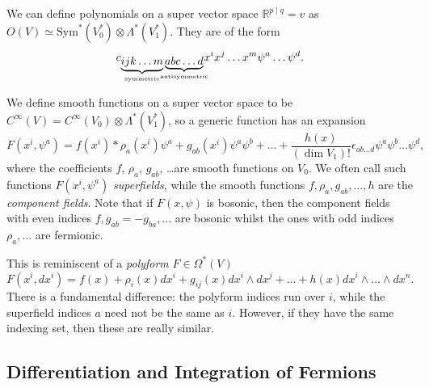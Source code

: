 
\begin{definition}[polynomials]
  We can define polynomials on a super vector space $\mathbb{R}^{p \mid q} = v$ as $O(V) \simeq \text{Sym}^*(V^*_0) \otimes \Lambda^* (V_1^*)$. They are of the form
  \begin{equation}
    c_{\underbrace{ijk \dots m}_{\mathclap{\text{symmetric}}} \underbrace{abc \dots d}_{\mathclap{\text{antisymmetric}}}} x^{i} x^{j} \dots x^{m} \psi^{a} \dots \psi^{d}.
  \end{equation}
\end{definition}
\begin{definition}
  We define smooth functions on a super vector space to be $C^\infty(V) = C^\infty(V_0) \otimes \Lambda^* (V_1^*)$, so a generic function has an expansion
  \begin{equation}
    F(x^{i}, \psi^{a}) = f(x^{i}) * \rho_a (x^{i}) \psi^{a} + g_{ab} (x^{i}) \psi^{a} \psi^{b} + \dots + \frac{h(x)}{(\dim V_1)!} \epsilon_{ab \dots d} \psi^{a} \psi^{b} \dots \psi^{d},
  \end{equation}
  where the coefficients $f$, $\rho_{a}$, $g_{ab}$, \dots are smooth functions on $V_0$. We often call such functions $F(x^{i}, \psi^{a})$ \emph{superfields}, while the smooth functions $f, \rho_a, g_{ab}, \dots, h$ are the \emph{component fields}.
  Note that if $F(x, \psi)$ is bosonic, then the component fields with even indices $f, g_{ab}=-g_{ba}, \dots$ are bosonic whilst the ones with odd indices $\rho_a, \dots$ are fermionic.
\end{definition}
\begin{remark}
  This is reminiscent of a \emph{polyform} $F\in \Omega^*(V)$
  \begin{equation}
    F(x^{i}, dx^{i}) = f(x) + \rho_i(x) dx^{i} + g_{ij} (x) dx^{i} \wedge dx^{j} + \dots + h(x) dx^{i} \wedge \dots \wedge dx^{n}.
  \end{equation}
  There is a fundamental difference: the polyform indices run over $i$, while the superfield indices $a$ need not be the same as $i$. However, if they have the same indexing set, then these are really similar.
\end{remark}

\subsection{Differentiation and Integration of Fermions}%
\label{sub:differentiation_and_integration_of_fermions}

